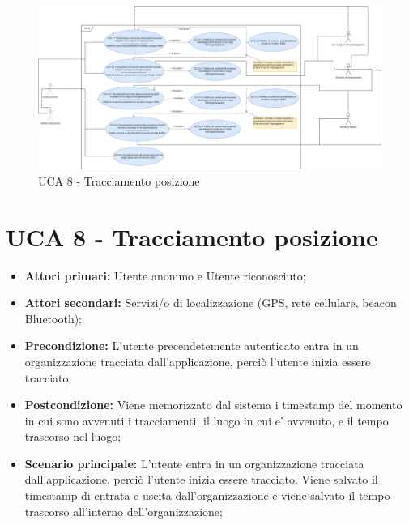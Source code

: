 \newpage
\begin{figure}[h]
	\centering
	\caption{UCA 8 - Tracciamento posizione}
	\includegraphics[scale=0.28]{sezioni/UseCase/Immagini/UCA8.png}
\end{figure}
\section{UCA 8 - Tracciamento posizione}%
\begin{itemize}
\item \textbf{Attori primari:} Utente anonimo e Utente riconosciuto;
\item \textbf{Attori secondari:} Servizi/o di localizzazione (GPS, rete cellulare, beacon Bluetooth);
\item \textbf{Precondizione:} L'utente precendetemente autenticato entra in un organizzazione tracciata dall'applicazione, perciò l'utente inizia essere tracciato;
\item \textbf{Postcondizione:} Viene memorizzato dal sistema i timestamp del momento in cui sono avvenuti i tracciamenti, il luogo in cui e’ avvenuto, e il tempo trascorso nel luogo;
\item \textbf{Scenario principale:} L'utente entra in un organizzazione tracciata dall'applicazione, perciò l'utente inizia essere tracciato. Viene salvato il timestamp di entrata e uscita dall'organizzazione e viene salvato il tempo trascorso all'interno dell'organizzazione;
\end{itemize}

